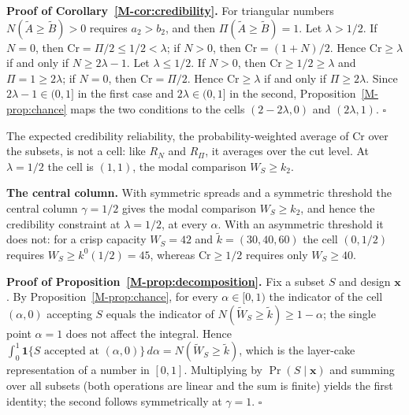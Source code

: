 \documentclass[11pt]{article}
\begin{document}
\textbf{Proof of Corollary~\ref*{M-cor:credibility}.} For triangular numbers $N(\tilde{A}\ge\tilde{B})>0$ requires $a_2>b_2$, and then
$\Pi(\tilde{A}\ge\tilde{B})=1$. Let $\lambda>1/2$. If $N=0$, then $\mathrm{Cr}=\Pi/2\le 1/2<\lambda$; if
$N>0$, then $\mathrm{Cr}=(1+N)/2$. Hence $\mathrm{Cr}\ge\lambda$ if and only if $N\ge 2\lambda-1$. Let
$\lambda\le 1/2$. If $N>0$, then $\mathrm{Cr}\ge 1/2\ge\lambda$ and $\Pi=1\ge 2\lambda$; if $N=0$, then
$\mathrm{Cr}=\Pi/2$. Hence $\mathrm{Cr}\ge\lambda$ if and only if $\Pi\ge 2\lambda$. Since
$2\lambda-1\in(0,1]$ in the first case and $2\lambda\in(0,1]$ in the second, Proposition~\ref*{M-prop:chance} maps the two
conditions to the cells $(2-2\lambda,0)$ and $(2\lambda,1)$. $\square$

The expected credibility reliability, the probability-weighted average of $\mathrm{Cr}$ over the subsets,
is not a cell: like $R_N$ and $R_\Pi$, it averages over the cut level. At $\lambda=1/2$ the cell is $(1,1)$,
the modal comparison $W_S\ge k_2$.

\textbf{The central column.} With symmetric spreads and a symmetric threshold the central column $\gamma=1/2$
gives the modal comparison $W_S\ge k_2$, and hence the credibility constraint at $\lambda=1/2$, at every
$\alpha$. With an asymmetric threshold it does not: for a crisp capacity $W_S=42$ and $\tilde{k}=(30,40,60)$ the
cell $(0,1/2)$ requires $W_S \ge k^0(1/2) = 45$, whereas $\mathrm{Cr}\ge 1/2$ requires only $W_S\ge 40$.

\textbf{Proof of Proposition~\ref*{M-prop:decomposition}.} Fix a subset $S$ and design $\mathbf{x}$. By
Proposition~\ref*{M-prop:chance}, for every $\alpha \in [0,1)$ the indicator of the cell $(\alpha,0)$ accepting
$S$ equals the indicator of $N(\tilde W_S \ge \tilde k) \ge 1-\alpha$; the single point $\alpha = 1$ does not
affect the integral. Hence $\int_0^1 \mathbf{1}\{S \text{ accepted at } (\alpha,0)\}\,d\alpha = N(\tilde W_S \ge \tilde k)$,
which is the layer-cake representation of a number in $[0,1]$. Multiplying by $\Pr(S \mid \mathbf{x})$ and
summing over all subsets (both operations are linear and the sum is finite) yields the first identity; the
second follows symmetrically at $\gamma=1$. $\square$
\end{document}
